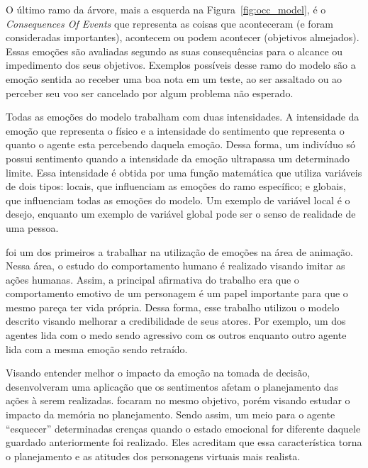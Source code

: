 O último ramo da árvore, mais a esquerda na Figura~\ref{fig:occ_model}, é o
\emph{Consequences Of Events} que representa as coisas que aconteceram (e
foram consideradas importantes), acontecem ou podem acontecer (objetivos
almejados)\dev{}. Essas emoções são avaliadas segundo as suas consequências
para o alcance ou impedimento dos seus objetivos. Exemplos possíveis desse
ramo do modelo são a emoção sentida ao receber uma boa nota em um teste, ao
ser assaltado ou ao perceber seu voo ser cancelado por algum problema não
esperado.

Todas as emoções do modelo trabalham com duas intensidades. A intensidade da
emoção que representa o físico e a intensidade do sentimento que representa o
quanto o agente esta percebendo daquela emoção. Dessa forma, um indivíduo só
possui sentimento quando a intensidade da emoção ultrapassa um
determinado limite\dev{}.  Essa intensidade é obtida por uma função matemática
que utiliza variáveis de dois tipos: locais, que influenciam as emoções do ramo
específico; e globais, que influenciam todas as emoções do modelo.  Um exemplo
de variável local é o desejo, enquanto um exemplo de variável global pode ser
o senso de realidade de uma pessoa.

\citet{bates1994role} foi um dos primeiros a trabalhar na utilização de emoções
na área de animação. Nessa área, o estudo do comportamento humano é realizado
visando imitar as ações humanas. Assim, a principal afirmativa do trabalho era
que o comportamento emotivo de um personagem é um papel importante para que o
mesmo pareça ter vida própria. Dessa forma, esse trabalho utilizou o modelo
descrito visando melhorar a credibilidade de seus atores. Por exemplo, um dos
agentes lida com o medo sendo agressivo com os outros enquanto outro agente
lida com a mesma emoção sendo retraído.


Visando entender melhor o impacto da emoção na tomada de decisão,
\citet{zhang2009emotional} desenvolveram uma aplicação que os sentimentos
afetam o planejamento das ações à serem realizadas.
\citet{neto2010construction} focaram no mesmo objetivo, porém visando estudar
o impacto da memória no planejamento. Sendo assim, um meio para o agente
``esquecer'' determinadas crenças quando o estado emocional for diferente
daquele guardado anteriormente foi realizado. Eles acreditam que essa
característica torna o planejamento e as atitudes dos personagens virtuais
mais realista.

